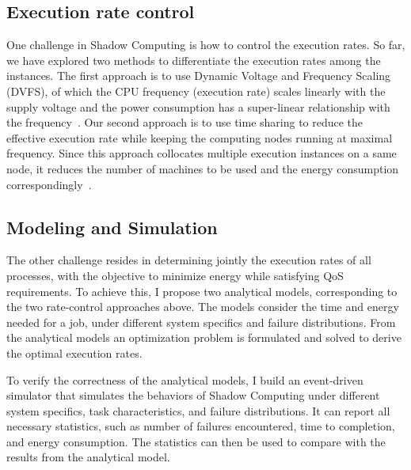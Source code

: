 \subsection{Execution rate control}
One challenge in Shadow Computing is how to control the execution rates. So far, we have explored two methods to differentiate the execution rates among the instances. The first approach is to use Dynamic Voltage and Frequency Scaling (DVFS), of which the CPU frequency (execution rate) scales linearly with the supply voltage and the power consumption has a super-linear relationship with the frequency~\cite{cui_en7085151,cui_closer_2014}. Our second approach is to use time sharing to reduce the effective execution rate while keeping the computing nodes running at maximal frequency. Since this approach collocates multiple execution instances on a same node, it reduces the number of machines to be used and the energy consumption correspondingly~\cite{cui_ics_2015}.

\subsection{Modeling and Simulation}
The other challenge resides in determining
jointly the execution rates of all processes, %
with the objective to minimize energy while satisfying QoS requirements. To achieve this, I propose two analytical
models, corresponding to the two rate-control approaches above. The models consider the time and energy needed for a job, %
under different system specifics and failure distributions. From the analytical models an optimization problem is formulated and solved to derive the optimal execution rates.  %

To verify the correctness of the analytical models, I build an event-driven simulator that simulates the behaviors of Shadow Computing under different system specifics, task characteristics, and failure distributions. It can report all necessary statistics, such as number of failures encountered, time to completion, and energy consumption. The statistics can then be used to compare with the results from the analytical model.


